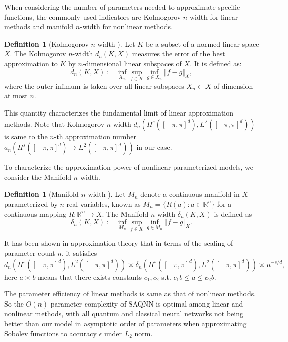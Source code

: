 \documentclass{article}
\theoremstyle{plain}
\theoremstyle{definition}
\newtheorem{definition}[theorem]{Definition}
\theoremstyle{remark}
\begin{document}
When considering the number of parameters needed to approximate specific functions, the commonly used indicators are Kolmogorov $n$-width for linear methods and manifold $n$-width for nonlinear methods. 
\begin{definition}[Kolmogorov $n$-width \cite{kolmogorov1936,pinkus2012}]
    Let $K$ be a subset of a normed linear space $X$. The Kolmogorov $n$-width $d_n(K,X)$ measures the error of the best approximation to $K$ by $n$-dimensional linear subspaces of $X$. It is defined as:
    \begin{equation*}
        d_n(K,X) := \inf_{X_n}\sup_{f\in K}\inf_{g\in X_n} \Vert f-g \Vert_X,
    \end{equation*}
    where the outer infimum is taken over all linear subspaces $X_n \subset X$ of dimension at most $n$. 
    
    This quantity characterizes the fundamental limit of linear approximation methods. Note that Kolmogorov $n$-width $d_n(H^s([-\pi,\pi]^d),L^2([-\pi,\pi]^d))$ is same to the $n$-th approximation number $a_n(H^s([-\pi,\pi]^d)\rightarrow L^2([-\pi,\pi]^d))$ in our case.
\end{definition}
To characterize the approximation power of nonlinear parameterized models, we consider the Manifold $n$-width.
\begin{definition}[Manifold $n$-width \cite{devore1989,maiorov1999}]
     Let $M_n$ denote a continuous manifold in $X$ parameterized by $n$ real variables, known as $M_n = \{R(a):a\in \mathbb{R}^n\}$ for a continuous mapping $R:\mathbb{R}^n\rightarrow X$. The Manifold $n$-width $\delta_n(K,X)$ is defined as 
    \begin{equation*}
        \delta_n(K,X) := \inf_{M_n}\sup_{f\in K}\inf_{g\in M_n} \Vert f-g \Vert_X.
    \end{equation*}
\end{definition}
It has been shown in approximation theory that in terms of the scaling of parameter count $n$, it satisfies \cite{devore1989,edmunds1996,pinkus2012,geller2014}
\begin{equation*}
    d_n(H^s([-\pi,\pi]^d),L^2([-\pi,\pi]^d)) \asymp
    \delta_n(H^s([-\pi,\pi]^d),L^2([-\pi,\pi]^d)) \asymp
    n^{-s/d},
\end{equation*}
here $a\asymp b$ means that there exists constants $c_1,c_2$ s.t. $c_1 b \leq a \leq c_2 b$.

The parameter efficiency of linear methods is same as that of nonlinear methods. So the $O(n)$ parameter complexity of SAQNN is optimal among linear and nonlinear methods, with all quantum and classical neural networks not being better than our model in asymptotic order of parameters when approximating Sobolev functions to accuracy $\epsilon$ under $L_2$ norm. 
\end{document}
